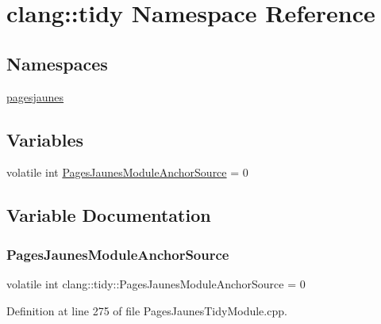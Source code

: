 \hypertarget{namespaceclang_1_1tidy}{}\section{clang\+:\+:tidy Namespace Reference}
\label{namespaceclang_1_1tidy}
\subsection*{Namespaces}
\begin{DoxyCompactItemize}
\item 
 \hyperlink{namespaceclang_1_1tidy_1_1pagesjaunes}{pagesjaunes}
\end{DoxyCompactItemize}
\subsection*{Variables}
\begin{DoxyCompactItemize}
\item 
volatile int \hyperlink{namespaceclang_1_1tidy_a368ba87b258dfc676f9714721f44162d}{Pages\+Jaunes\+Module\+Anchor\+Source} = 0
\end{DoxyCompactItemize}


\subsection{Variable Documentation}
\mbox{\label{namespaceclang_1_1tidy_a368ba87b258dfc676f9714721f44162d}} 
\subsubsection{\texorpdfstring{Pages\+Jaunes\+Module\+Anchor\+Source}{PagesJaunesModuleAnchorSource}}
{\footnotesize\ttfamily volatile int clang\+::tidy\+::\+Pages\+Jaunes\+Module\+Anchor\+Source = 0}



Definition at line 275 of file Pages\+Jaunes\+Tidy\+Module.\+cpp.

